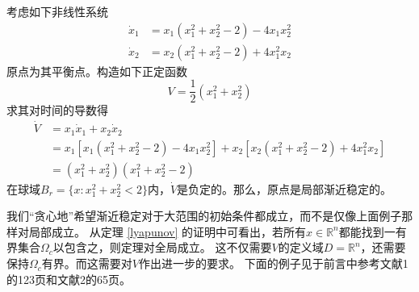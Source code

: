 \begin{example}[局部渐近稳定]
  考虑如下非线性系统\[\begin{aligned}\dot{x}_1&=x_1(x_1^2+x_2^2-2)-4x_1x_2^2\\\dot{x}_2&=x_2(x_1^2+x_2^2-2)+4x_1^2x_2\end{aligned}\]
  原点为其平衡点。构造如下正定函数\[V=\frac{1}{2}(x_1^2+x_2^2)\]
  求其对时间的导数得\[\begin{aligned}
    \dot{V}& =x_{1}\dot{x}_{1}+x_{2}\dot{x}_{2} \\
    &=x_{1}[x_{1}(x_{1}^{2}+x_{2}^{2}-2)-4x_{1}x_{2}^{2}]+x_{2}[x_{2}(x_{1}^{2}+x_{2}^{2}-2)+4x_{1}^{2}x_{2}] \\
    &=(x_1^2+x_2^2)(x_1^2+x_2^2-2)
    \end{aligned}\]
  在球域$B_r=\{x:x_1^2+x_2^2<2\}$内，$\dot{V}$是负定的。那么，原点是局部渐近稳定的。
\end{example}
我们“贪心地”希望渐近稳定对于大范围的初始条件都成立，而不是仅像上面例子那样对局部成立。
从定理 \ref{lyapunov} 的证明中可看出，若所有$x\in\mathbb{R}^n$都能找到一有界集合$\Omega_c$以包含之，则定理对全局成立。
这不仅需要$V$的定义域$D=\mathbb{R}^n$，还需要保持$\Omega_c$有界。而这需要对$V$作出进一步的要求。
下面的例子见于前言中参考文献1的123页和文献2的65页。


